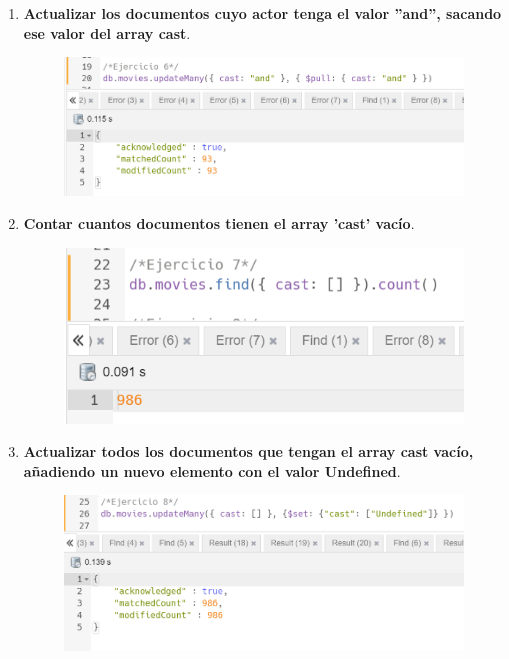 \documentclass[a4paper,onecolumn]{article}
\begin{document}
\begin{sloppypar}
\begin{enumerate}
\begin{center}
\begin{figure}[h!]
        \end{figure}
    \end{center}
    \item \textbf{Actualizar los documentos cuyo actor tenga el valor ''and'', sacando ese valor del array cast}.
    \begin{center}
        \begin{figure}[h!]
            \includegraphics[width=\textwidth]{querys/6.png}
        \end{figure}
    \end{center}
    \item \textbf{Contar cuantos documentos tienen el array 'cast' vacío}.
    \begin{center}
        \begin{figure}[h!]
            \includegraphics[width=\textwidth]{querys/7.png}
        \end{figure}
    \end{center}
    \item \textbf{Actualizar todos los documentos que tengan el array cast vacío, añadiendo un nuevo elemento con el valor Undefined}.
    \begin{center}
        \begin{figure}[h!]
            \includegraphics[width=\textwidth]{querys/8.png}

\end{figure}
\end{center}
\end{enumerate}
\end{sloppypar}
\end{document}
